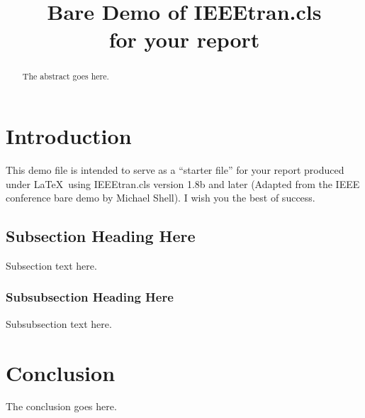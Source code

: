 \documentclass[conference]{IEEEtran}
\begin{document}
%
\title{Bare Demo of IEEEtran.cls\\ for your report}

\author{
}

\maketitle

\begin{abstract}
The abstract goes here.
\end{abstract}


\section{Introduction}
This demo file is intended to serve as a ``starter file''
for your report produced under \LaTeX\ using
IEEEtran.cls version 1.8b and later (Adapted from the IEEE conference bare demo by Michael Shell).
I wish you the best of success.

\subsection{Subsection Heading Here}
Subsection text here.

\subsubsection{Subsubsection Heading Here}
Subsubsection text here.


\section{Conclusion}
The conclusion goes here.
\end{document}
